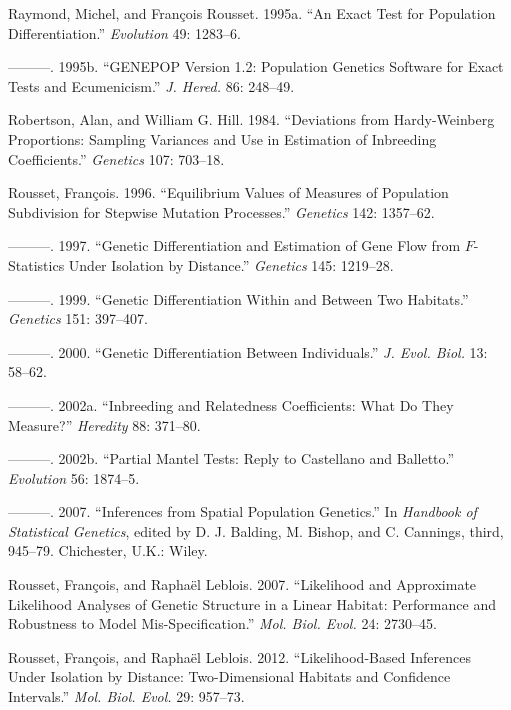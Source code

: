 \documentclass[12pt,]{book}
\theoremstyle{definition}
\theoremstyle{definition}
\theoremstyle{definition}
\theoremstyle{remark}
\begin{document}
\hypertarget{ref-RaymondR95evol}{}
Raymond, Michel, and François Rousset. 1995a. ``An Exact Test for
Population Differentiation.'' \emph{Evolution} 49: 1283--6.

\hypertarget{ref-RaymondR95}{}
---------. 1995b. ``GENEPOP Version 1.2: Population Genetics Software
for Exact Tests and Ecumenicism.'' \emph{J. Hered.} 86: 248--49.

\hypertarget{ref-RobertsonH84}{}
Robertson, Alan, and William G. Hill. 1984. ``Deviations from
Hardy-Weinberg Proportions: Sampling Variances and Use in Estimation of
Inbreeding Coefficients.'' \emph{Genetics} 107: 703--18.

\hypertarget{ref-Rousset96}{}
Rousset, François. 1996. ``Equilibrium Values of Measures of Population
Subdivision for Stepwise Mutation Processes.'' \emph{Genetics} 142:
1357--62.

\hypertarget{ref-Rousset97}{}
---------. 1997. ``Genetic Differentiation and Estimation of Gene Flow
from \(F\)-Statistics Under Isolation by Distance.'' \emph{Genetics}
145: 1219--28.

\hypertarget{ref-Rousset99g}{}
---------. 1999. ``Genetic Differentiation Within and Between Two
Habitats.'' \emph{Genetics} 151: 397--407.

\hypertarget{ref-Rousset00}{}
---------. 2000. ``Genetic Differentiation Between Individuals.''
\emph{J. Evol. Biol.} 13: 58--62.

\hypertarget{ref-Rousset02h}{}
---------. 2002a. ``Inbreeding and Relatedness Coefficients: What Do
They Measure?'' \emph{Heredity} 88: 371--80.

\hypertarget{ref-Rousset02e}{}
---------. 2002b. ``Partial Mantel Tests: Reply to Castellano and
Balletto.'' \emph{Evolution} 56: 1874--5.

\hypertarget{ref-Rousset07w}{}
---------. 2007. ``Inferences from Spatial Population Genetics.'' In
\emph{Handbook of Statistical Genetics}, edited by D. J. Balding, M.
Bishop, and C. Cannings, third, 945--79. Chichester, U.K.: Wiley.

\hypertarget{ref-RoussetL07}{}
Rousset, François, and Raphaël Leblois. 2007. ``Likelihood and
Approximate Likelihood Analyses of Genetic Structure in a Linear
Habitat: Performance and Robustness to Model Mis-Specification.''
\emph{Mol. Biol. Evol.} 24: 2730--45.

\hypertarget{ref-RoussetL12}{}
Rousset, François, and Raphaël Leblois. 2012. ``Likelihood-Based
Inferences Under Isolation by Distance: Two-Dimensional Habitats and
Confidence Intervals.'' \emph{Mol. Biol. Evol.} 29: 957--73.
\end{document}
